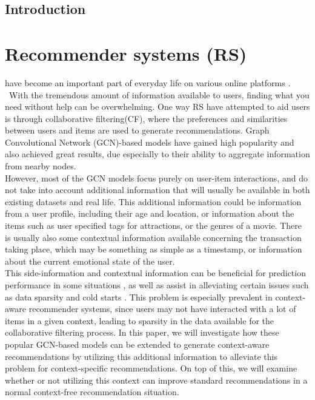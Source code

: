 \noindent
\section{Introduction}
\chapter{Recommender systems (RS)}\label{ch:introduction}
have become an important part of everyday life on various online platforms \cite{youtuberecommendation, industryperspective}.\\\
With the tremendous amount of information available to users, finding what you need without help can be overwhelming.
One way RS have attempted to aid users is through collaborative filtering(CF), where the preferences and similarities between users and items are used to generate recommendations. 
Graph Convolutional Network (GCN)-based models \cite{NGCF,LightGCN,KGAT} have gained high popularity and also achieved great results, due especially to their ability to aggregate information from nearby nodes.\\
However, most of the GCN models focus purely on user-item interactions, and do not take into account additional information that will usually be available in both existing datasets and real life.
This additional information could be information from a user profile, including their age and location, or information about the items such as user specified tags for attractions, or the genres of a movie.
There is usually also some contextual information available concerning the transaction taking place, which may be something as simple as a timestamp, or information about the current emotional state of the user.\\
This side-information and contextual information can be beneficial for prediction performance in some situations \cite{ContextImportance, ContextImportance2, ContextImportance3}, as well as assist in alleviating certain issues such as data sparsity and cold starts \cite{SideInfoDefinition}.
This problem is especially prevalent in context-aware recommender systems, since users may not have interacted with a lot of items in a given context, leading to sparsity in the data available for the collaborative filtering process.
In this paper, we will investigate how these popular GCN-based models can be extended to generate context-aware recommendations by utilizing this additional information to alleviate this problem for context-specific recommendations.
On top of this, we will examine whether or not utilizing this context can improve standard recommendations in a normal context-free recommendation situation.
